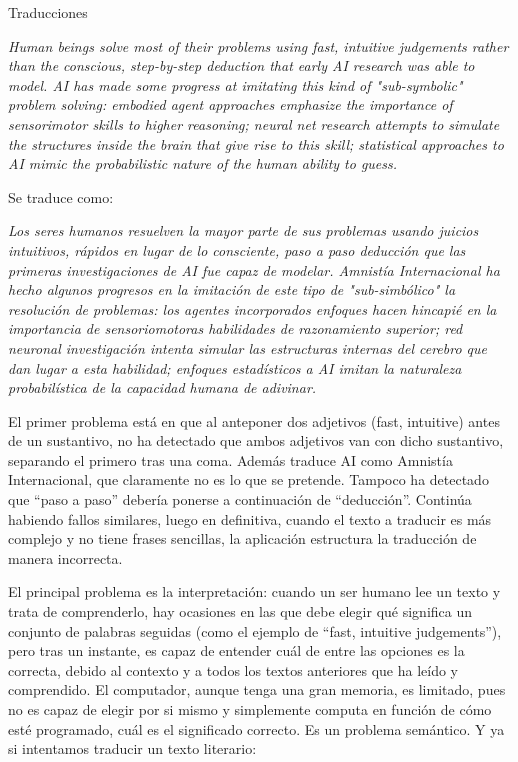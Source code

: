 \documentclass[spanish, a4paper, 12pt]{article} 	%
\begin{document}
\newpage
\begin{section}{Traducciones}

	\textit{Human beings solve most of their problems using fast, intuitive judgements rather than the conscious, step-by-step deduction that early AI research was able to model. AI has made some progress at imitating this kind of "sub-symbolic" problem solving: embodied agent approaches emphasize the importance of sensorimotor skills to higher reasoning; neural net research attempts to simulate the structures inside the brain that give rise to this skill; statistical approaches to AI mimic the probabilistic nature of the human ability to guess.}

	\vspace{0.5cm}

	Se traduce como:

	\vspace{0.5cm}

	\textit{Los seres humanos resuelven la mayor parte de sus problemas usando juicios intuitivos, rápidos en lugar de lo consciente, paso a paso deducción que las primeras investigaciones de AI fue capaz de modelar. Amnistía Internacional ha hecho algunos progresos en la imitación de este tipo de "sub-simbólico" la resolución de problemas: los agentes incorporados enfoques hacen hincapié en la importancia de sensoriomotoras habilidades de razonamiento superior; red neuronal investigación intenta simular las estructuras internas del cerebro que dan lugar a esta habilidad; enfoques estadísticos a AI imitan la naturaleza probabilística de la capacidad humana de adivinar.	}
	
	\vspace{0.5cm}

	El primer problema está en que al anteponer dos adjetivos (fast, intuitive) antes de un sustantivo, no ha detectado que ambos adjetivos van con dicho sustantivo, separando el primero tras una coma. Además traduce AI como Amnistía Internacional, que claramente no es lo que se pretende. Tampoco ha detectado que ``paso a paso'' debería ponerse a continuación de ``deducción''. Continúa habiendo fallos similares, luego en definitiva, cuando el texto a traducir es más complejo y no tiene frases sencillas, la aplicación estructura la traducción de manera incorrecta. 
	
	El principal problema es la interpretación: cuando un ser humano lee un texto y trata de comprenderlo, hay ocasiones en las que debe elegir qué significa un conjunto de palabras seguidas (como el ejemplo de ``fast, intuitive judgements''), pero tras un instante, es capaz de entender cuál de entre las opciones es la correcta, debido al contexto y a todos los textos anteriores que ha leído y comprendido. El computador, aunque tenga una gran memoria, es limitado, pues no es capaz de elegir por si mismo y simplemente computa en función de cómo esté programado, cuál es el significado correcto. Es un problema semántico. Y ya si intentamos traducir un texto literario:
	

\end{section}
\end{document}
